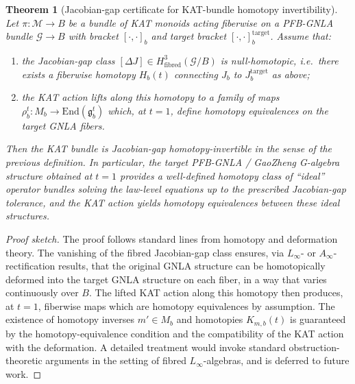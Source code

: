 \documentclass[11pt]{book}
\theoremstyle{plain}
\newtheorem{theorem}{Theorem}[chapter]
\theoremstyle{definition}
\theoremstyle{remark}
\begin{document}
\begin{theorem}[Jacobian-gap certificate for KAT-bundle homotopy invertibility]\label{thm:KAT-jacobi-homotopy-invertible}
Let $\pi:\mathcal{M}\to B$ be a bundle of KAT monoids acting fiberwise
on a PFB-GNLA bundle $\mathcal{G}\to B$ with bracket
$[\cdot,\cdot]_b$ and target bracket $[\cdot,\cdot]_b^{\mathrm{target}}$.
Assume that:
\begin{enumerate}[label=(\roman*)]
  \item the Jacobian-gap class
        $[\Delta J]\in H^3_{\mathrm{fibred}}(\mathcal{G}/B)$ is
        null-homotopic, i.e.\ there exists a fiberwise homotopy
        $H_b(t)$ connecting $J_b$ to $J_b^{\mathrm{target}}$ as above;
  \item the KAT action lifts along this homotopy to a family of maps
        $\rho_b^t:M_b\to\mathrm{End}(\mathfrak{g}_b^t)$ which, at
        $t=1$, define homotopy equivalences on the target GNLA
        fibers.
\end{enumerate}
Then the KAT bundle is Jacobian-gap homotopy-invertible in the sense
of the previous definition. In particular, the target PFB-GNLA /
GaoZheng G-algebra structure obtained at $t=1$ provides a well-defined
homotopy class of ``ideal'' operator bundles solving the law-level
equations up to the prescribed Jacobian-gap tolerance, and the KAT
action yields homotopy equivalences between these ideal structures.
\end{theorem}

\begin{proof}[Proof sketch]
The proof follows standard lines from homotopy and deformation theory.
The vanishing of the fibred Jacobian-gap class ensures, via
$L_\infty$- or $A_\infty$-rectification results, that the original
GNLA structure can be homotopically deformed into the target GNLA
structure on each fiber, in a way that varies continuously over $B$.
The lifted KAT action along this homotopy then produces, at $t=1$,
fiberwise maps which are homotopy equivalences by assumption. The
existence of homotopy inverses $m'\in M_b$ and homotopies
$K_{m,b}(t)$ is guaranteed by the homotopy-equivalence condition and
the compatibility of the KAT action with the deformation. A detailed
treatment would invoke standard obstruction-theoretic arguments in
the setting of fibred $L_\infty$-algebras, and is deferred to future
work.
\end{proof}
\end{document}
